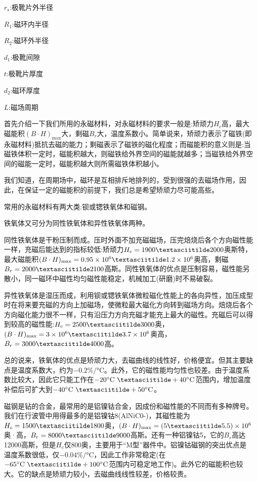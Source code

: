 $ r_s $:极靴片外半径

$ R_1 $:磁环内半径

$ R_2 $:磁环外半径

$ d_1 $:极靴间隙

$ t $:极靴片厚度

$ d_2 $:磁环厚度

$ L $:磁场周期


首先介绍一下我们所用的永磁材料，对永磁材料的要求一般是:矫顽力$ H_c $高，最大磁能积$ (B\cdot H)_\textrm{max} $大，剩磁$ B_r $大，温度系数小。简单说来，矫顽力表示了磁铁(即永磁材料)抵抗去磁的能力；剩磁表示了磁铁的磁化程度；而磁能积的意义则是:当磁铁体积一定时，磁能积越大，则磁铁给外界空间的磁能就越多；当磁铁给外界空间的磁能一定时，磁能积越大则所需磁铁体积越小。

我们知道，在周期场中，磁环是互相排斥地排列的，受到很强的去磁场作用，因此，在保证一定的磁能积的前提下，我们总是希望矫顽力尽可能高些。

常用的永磁材料有两大类:钡或锶铁氧体和磁钢。

铁氧体又可分为同性铁氧体和异性铁氧体两种。

同性铁氧体是干粉压制而成。压时外面不加充磁磁场，压完焙烧后各个方向磁性能一样，充磁后能达到的指标较低:矫顽力$ H_c = 1900\textasciitilde 2000 $奥斯特，最大磁能积$ (B\cdot H)_\textrm{max} = 0.95\times 10^6 \textasciitilde 1.2\times 10^6$奥高，剩磁$ B_r = 2000\textasciitilde 2100 $高斯。同性铁氧体的优点是压制容易，磁性能另散小，同一磁环中磁性均匀磁性能稳定，机械加工(研磨)时不易破裂。

异性铁氧体是湿压而成，利用钡或锶铁氧体微粒磁化性能上的各向异性，加压成型时在将来要充磁的方向上加磁场，使微粒最大磁化方向转到磁场方向。焙烧后各个方向磁化能力很不一样，只有沿压力方向充磁才能充上最大的磁性。充磁后可以得到较高的磁性能:$ H_c = 2500\textasciitilde 3000 $奥，$ (B\cdot H)_\textrm{max} = 3\times 10^6 \textasciitilde 3.7\times 10^6$奥高，$ B_r = 3000\textasciitilde 4000 $高。

总的说来，铁氧体的优点是矫顽力大，去磁曲线的线性好，价格便宜。但其主要缺点是温度系数大，约为$ -0.2 \%/\si{\degreeCelsius}$。此外，它的磁性能均匀性也较差。由于温度系数比较大，因此它只能工作在$ -20\si{\degreeCelsius}~\textasciitilde +40\si{\degreeCelsius} $范围内，增加温度补偿后可扩大到$ -40\si{\degreeCelsius}~\textasciitilde +50\si{\degreeCelsius} $。

磁钢是钻的合金，最常用的是铝镍钴合金，因成份和磁性能的不同而有多种牌号。我们在行波管中用得最多的是铝镍钴8(AlNiC0-\uppercase\expandafter{})，其磁性能为$ H_c = 1500\textasciitilde 1800 $奥，$ (B\cdot H)_\textrm{max} = (5\textasciitilde 5.5)\times 10^6$奥·高，$ B_r = 8000\textasciitilde 9000 $高斯。还有一种铝镍钴5，它的$ B_r $高达12000高斯，但是$ H_c $仅800奥，主要用于“M型”器件中。铝镍钴磁钢的突出优点是温度系数很低，仅$ -0.04 \%/\si{\degreeCelsius}$，因此工作非常稳定(在$ -65\si{\degreeCelsius}~\textasciitilde +100\si{\degreeCelsius} $范围内可稳定地工作)。此外它的磁能积也较大。它的缺点是矫顽力较小，去磁曲线线性较差，价格较贵。


